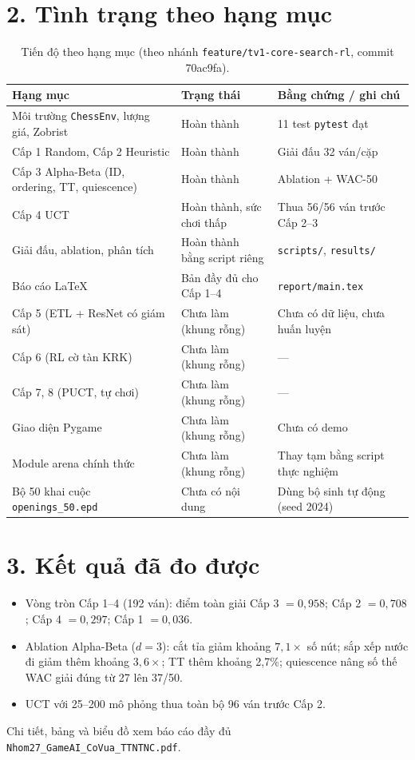 \documentclass[13pt,a4paper]{extreport}
\newcommand{\code}[1]{\texttt{#1}}
\begin{document}
\section*{2. Tình trạng theo hạng mục}
\begin{table}[H]\centering\small\caption{Tiến độ theo hạng mục (theo nhánh \code{feature/tv1-core-search-rl}, commit 70ac9fa).}
\begin{tabularx}{\textwidth}{l l Y}\toprule Hạng mục & Trạng thái & Bằng chứng / ghi chú\\\midrule
Môi trường \code{ChessEnv}, lượng giá, Zobrist & Hoàn thành & 11 test \code{pytest} đạt\\
Cấp 1 Random, Cấp 2 Heuristic & Hoàn thành & Giải đấu 32 ván/cặp\\
Cấp 3 Alpha-Beta (ID, ordering, TT, quiescence) & Hoàn thành & Ablation + WAC-50\\
Cấp 4 UCT & Hoàn thành, sức chơi thấp & Thua 56/56 ván trước Cấp 2--3\\
Giải đấu, ablation, phân tích & Hoàn thành bằng script riêng & \code{scripts/}, \code{results/}\\
Báo cáo LaTeX & Bản đầy đủ cho Cấp 1--4 & \code{report/main.tex}\\
Cấp 5 (ETL + ResNet có giám sát) & Chưa làm (khung rỗng) & Chưa có dữ liệu, chưa huấn luyện\\
Cấp 6 (RL cờ tàn KRK) & Chưa làm (khung rỗng) & ---\\
Cấp 7, 8 (PUCT, tự chơi) & Chưa làm (khung rỗng) & ---\\
Giao diện Pygame & Chưa làm (khung rỗng) & Chưa có demo\\
Module arena chính thức & Chưa làm (khung rỗng) & Thay tạm bằng script thực nghiệm\\
Bộ 50 khai cuộc \code{openings\_50.epd} & Chưa có nội dung & Dùng bộ sinh tự động (seed 2024)\\
\bottomrule\end{tabularx}\end{table}

\section*{3. Kết quả đã đo được}
\begin{itemize}
\item Vòng tròn Cấp 1--4 (192 ván): điểm toàn giải Cấp 3 $=0{,}958$; Cấp 2 $=0{,}708$; Cấp 4 $=0{,}297$; Cấp 1 $=0{,}036$.
\item Ablation Alpha-Beta ($d=3$): cắt tỉa giảm khoảng $7{,}1\times$ số nút; sắp xếp nước đi giảm thêm khoảng $3{,}6\times$; TT thêm khoảng 2,7\%; quiescence nâng số thế WAC giải đúng từ 27 lên 37/50.
\item UCT với 25--200 mô phỏng thua toàn bộ 96 ván trước Cấp 2.
\end{itemize}
Chi tiết, bảng và biểu đồ xem báo cáo đầy đủ \code{Nhom27\_GameAI\_CoVua\_TTNTNC.pdf}.
\end{document}
